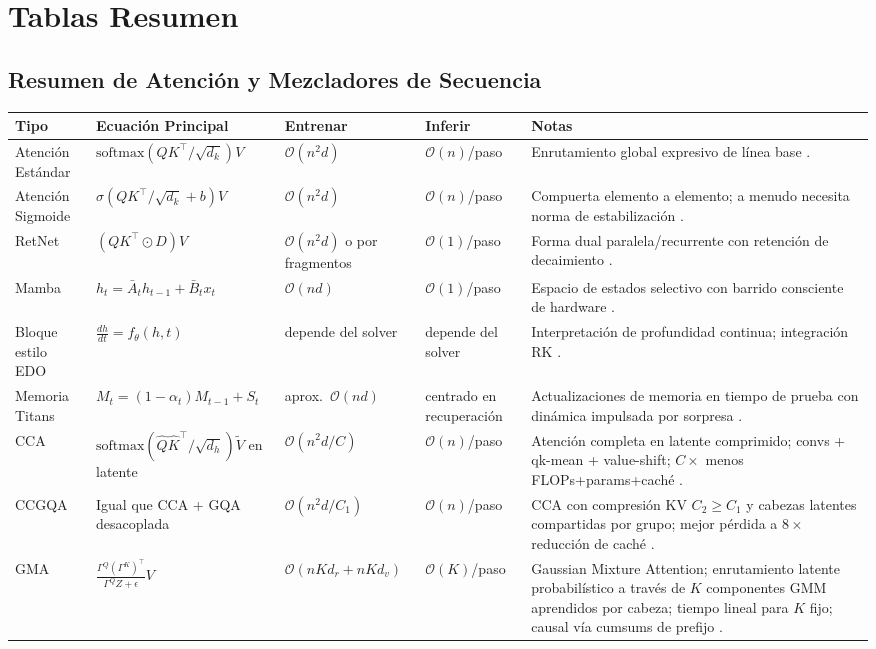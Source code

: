 \section{Tablas Resumen}
\label{sec:summary-tables}

\subsection{Resumen de Atención y Mezcladores de Secuencia}
\small
\begin{longtable}{p{2.4cm}p{3.2cm}p{2.0cm}p{2.0cm}p{4.8cm}}
\toprule
\textbf{Tipo} & \textbf{Ecuación Principal} & \textbf{Entrenar} & \textbf{Inferir} & \textbf{Notas} \\
\midrule
\endhead
Atención Estándar & $\text{softmax}(QK^\top/\sqrt{d_k})V$ & $\mathcal{O}(n^2d)$ & $\mathcal{O}(n)$/paso & Enrutamiento global expresivo de línea base \citep{vaswani_attention_2017}. \\
Atención Sigmoide & $\sigma(QK^\top/\sqrt{d_k}+b)V$ & $\mathcal{O}(n^2d)$ & $\mathcal{O}(n)$/paso & Compuerta elemento a elemento; a menudo necesita norma de estabilización \citep{ramapuram_theory_2024}. \\
RetNet & $(QK^\top\odot D)V$ & $\mathcal{O}(n^2d)$ o por fragmentos & $\mathcal{O}(1)$/paso & Forma dual paralela/recurrente con retención de decaimiento \citep{sun_retentive_2023}. \\
Mamba & $h_t=\bar{A}_t h_{t-1}+\bar{B}_t x_t$ & $\mathcal{O}(nd)$ & $\mathcal{O}(1)$/paso & Espacio de estados selectivo con barrido consciente de hardware \citep{gu_mamba_2023}. \\
Bloque estilo EDO & $\frac{dh}{dt}=f_\theta(h,t)$ & depende del solver & depende del solver & Interpretación de profundidad continua; integración RK \citep{zhang_continuous_2021}. \\
Memoria Titans & $M_t=(1-\alpha_t)M_{t-1}+S_t$ & aprox.\ $\mathcal{O}(nd)$ & centrado en recuperación & Actualizaciones de memoria en tiempo de prueba con dinámica impulsada por sorpresa \citep{behrouz_titans_2025}. \\
CCA & $\text{softmax}(\hat Q\hat K^\top/\sqrt{d_h})\tilde V$ en latente & $\mathcal{O}(n^2d/C)$ & $\mathcal{O}(n)$/paso & Atención completa en latente comprimido; convs + qk-mean + value-shift; $C{\times}$ menos FLOPs+params+caché \citep{figliola_cca_2025}. \\
CCGQA & Igual que CCA + GQA desacoplada & $\mathcal{O}(n^2d/C_1)$ & $\mathcal{O}(n)$/paso & CCA con compresión KV $C_2\geq C_1$ y cabezas latentes compartidas por grupo; mejor pérdida a $8{\times}$ reducción de caché \citep{figliola_cca_2025}. \\
GMA & $\frac{\Gamma^Q(\Gamma^K)^\top}{\Gamma^Q Z+\epsilon}V$ & $\mathcal{O}(nKd_r+nKd_v)$ & $\mathcal{O}(K)$/paso & Gaussian Mixture Attention; enrutamiento latente probabilístico a través de $K$ componentes GMM aprendidos por cabeza; tiempo lineal para $K$ fijo; causal vía cumsums de prefijo \citep{huang_gma_2026}. \\
\bottomrule
\end{longtable}
\normalsize

